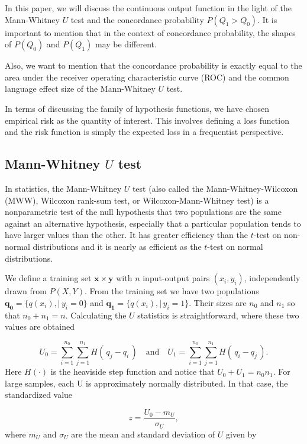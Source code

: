 \documentclass{article}
\theoremstyle{theorem}
\theoremstyle{definition}
\newcommand{\bu}[1]{\mathbf{#1}}
\newcommand{\bv}[1]{\bm{#1}}
\begin{document}
In this paper, we will discuss the continuous output function in the light of the Mann-Whitney $U$ test and the concordance probability $P(Q_1 > Q_0)$.  It is important to mention that in the context of concordance probability, the shapes of $P(Q_0)$ and $P(Q_1)$ may be different. 

Also, we want to mention that the concordance probability is exactly equal to the area under the receiver operating characteristic curve (ROC) and the common language effect size of the Mann-Whitney $U$ test.

In terms of discussing the family of hypothesis functions, we have chosen empirical risk as the quantity of interest.  This involves defining a loss function and the risk function is simply the expected loss in a frequentist perspective.

\subsection{Mann-Whitney $U$ test}
\label{sec:U}

In statistics, the Mann-Whitney $U$ test (also called the Mann-Whitney-Wilcoxon (MWW), Wilcoxon rank-sum test, or Wilcoxon-Mann-Whitney test) is a nonparametric test of the null hypothesis that two populations are the same against an alternative hypothesis, especially that a particular population tends to have larger values than the other.  It has greater efficiency than the $t$-test on non-normal distributions and it is nearly as efficient as the $t$-test on normal distributions.

We define a training set $\bu{x} \times \bv{y}$ with $n$ input-output pairs $(x_i, y_i)$, independently drawn from $P(X,Y)$.  From the training set we have two populations $\bv{q_0} = \{q(x_i) , | \, y_i = 0 \}$ and $\bv{q_1} = \{q(x_i) , | \, y_i = 1 \}$.  Their sizes are $n_0$ and $n_1$ so that $n_0 + n_1 = n$.  Calculating the $U$ statistics is straightforward, where these two values are obtained 

\begin{equation}
\label{eq:U}
U_0 = \sum_{i=1}^{n_0}\sum_{j=1}^{n_1} H(\,q_j - q_i    \,) \quad \mbox{and} \quad 
U_1 = \sum_{i=1}^{n_0}\sum_{j=1}^{n_1} H( \,q_i - q_j    \,).
\end{equation}
Here $H(\cdot)$ is the heaviside step function and notice that $U_0 + U_1 = n_0n_1$.  For large samples, each U is approximately normally distributed. In that case, the standardized value

\begin{equation}
\label{eq:z}
z = \frac{U_0 - m_{U}}{\sigma_{U}},
\end{equation}
where $m_U$ and $\sigma_U$ are the mean and standard deviation of $U$ given by
\end{document}
